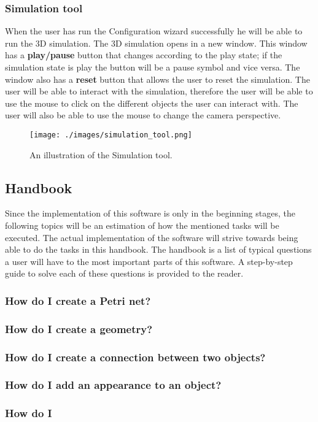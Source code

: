 \documentclass[fontsize=12pt, paper=a4]{article}
\begin{document}
\subsubsection{Simulation tool}
When the user has run the Configuration wizard successfully he will be able to run the 3D simulation. The 3D simulation opens in a new window. This window has a \textbf{play/pause} button that changes according to the play state; if the simulation state is play the button will be a pause symbol and vice versa. The window also has a \textbf{reset} button that allows the user to reset the simulation.
The user will be able to interact with the simulation, therefore the user will be able to use the mouse to click on the different objects the user can interact with. The user will also be able to use the mouse to change the camera perspective.

\begin{figure}[H]
\begin{center}
\texttt{[image: ./images/simulation\_tool.png]}
\caption{An illustration of the Simulation tool.}
\label{fig:simulation_tool.}
\end{center}
\end{figure}

\subsection{Handbook}
Since the implementation of this software is only in the beginning stages, the following topics will be an estimation of how the mentioned tasks will be executed. The actual implementation of the software will strive towards being able to do the tasks in this handbook. 
The handbook is a list of typical questions a user will have to the most important parts of this software. A step-by-step guide to solve each of these questions is provided to the reader.

\subsubsection{How do I create a Petri net?}

\subsubsection{How do I create a geometry?}

\subsubsection{How do I create a connection between two objects?}

\subsubsection{How do I add an appearance to an object?}

\subsubsection{How do I }
\end{document}
